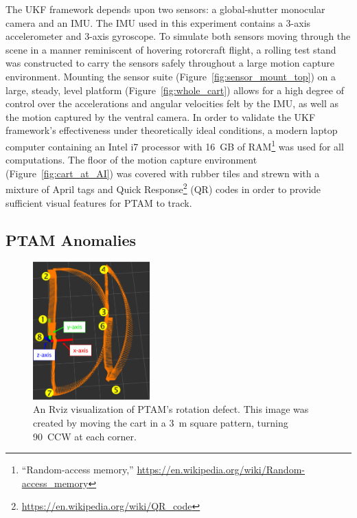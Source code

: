 The UKF framework depends upon two sensors: a global-shutter monocular camera and an IMU. The IMU used in this experiment contains a 3-axis accelerometer and 3-axis gyroscope. To simulate both sensors moving through the scene in a manner reminiscent of hovering rotorcraft flight, a rolling test stand was constructed to carry the sensors safely throughout a large motion capture environment. Mounting the sensor suite (Figure~\ref{fig:sensor_mount_top}) on a large, steady, level platform (Figure~\ref{fig:whole_cart}) allows for a high degree of control over the accelerations and angular velocities felt by the IMU, as well as the motion captured by the ventral camera. In order to validate the UKF framework's effectiveness under theoretically ideal conditions, a modern laptop computer containing an Intel i7 processor with 16~GB of RAM\footnote{``Random-access memory,'' \url{https://en.wikipedia.org/wiki/Random-access_memory}} was used for all computations. The floor of the motion capture environment (Figure~\ref{fig:cart_at_AI}) was covered with rubber tiles and strewn with a mixture of April tags and Quick Response\footnote{\url{https://en.wikipedia.org/wiki/QR_code}} (QR) codes in order to provide sufficient visual features for PTAM to track.

\subsection{PTAM Anomalies}

\begin{figure}
    \includegraphics[width=0.4\textwidth]{rot_bug_rviz}
  \caption[Rviz Visualization of Rotational Distortion]{An Rviz visualization of PTAM's rotation defect. This image was created by moving the cart in a 3~m square pattern, turning 90\textdegree\ CCW at each corner.}
  \label{fig:rot_bug_rviz}
\end{figure}

